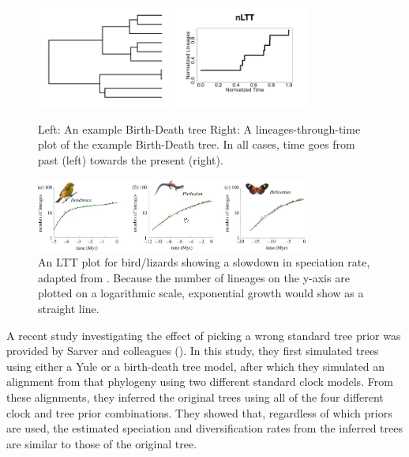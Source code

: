\begin{figure}[H]
  \includegraphics[width=0.4\textwidth]{bd_tree.png}
  \includegraphics[width=0.4\textwidth]{bd_tree_nltt.png}
  \caption{
    Left: An example Birth-Death tree
    Right: A lineages-through-time plot of the example Birth-Death tree.
    In all cases, time goes from past (left) towards the present (right).
  }
  \label{fig:bd}
\end{figure}

\begin{figure}[H]
  \includegraphics[width=0.8\textwidth]{etienne_et_al_2012_dd_1.png}
  \caption{
    An LTT plot for bird/lizards showing a slowdown in speciation
    rate, adapted from \cite{etienne2012diversity}. Because the number
    of lineages on the y-axis are plotted on a logarithmic scale,
    exponential growth would show as a straight line. 
  }
  \label{fig:dd}
\end{figure}

A recent study investigating the effect of picking
a wrong standard tree prior was provided by Sarver and 
colleagues (\cite{sarver2019choice}).
In this study, they first simulated trees using either a Yule or a birth-death
tree model, after which they simulated an alignment from that phylogeny
using two different standard clock models. From these alignments, 
they inferred the original trees using all of the four 
different clock and tree prior combinations. 
They showed that, regardless of which priors are used,
the estimated speciation and diversification rates 
from the inferred trees are similar to those of the original tree.

